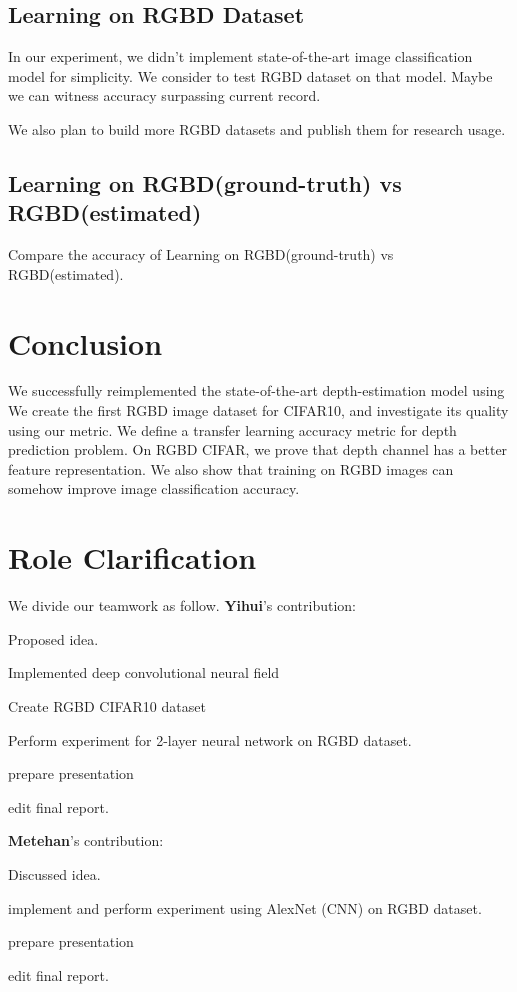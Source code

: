 \documentclass[10pt,twocolumn,letterpaper]{article}
\begin{document}
 
\subsection{Learning on RGBD Dataset}
In our experiment, we didn\rq{}t implement state-of-the-art image classification model\cite{he2015deep} for simplicity.
We consider to test RGBD dataset on that model. 
Maybe we can witness accuracy surpassing current record.

We also plan to build more RGBD datasets and publish them for research usage.

\subsection{Learning on RGBD(ground-truth) vs RGBD(estimated)}
Compare the accuracy of Learning on RGBD(ground-truth) vs RGBD(estimated).

\section{Conclusion}
We successfully reimplemented the state-of-the-art depth-estimation model using
We create the first RGBD image dataset for CIFAR10, and investigate its quality 
using our metric.
We define a transfer learning accuracy metric for depth prediction problem.
On RGBD CIFAR, we prove that depth channel has a better feature representation.
We also show that training on RGBD images can somehow improve image 
classification accuracy.


\section*{Role Clarification}
We divide our teamwork as follow. {\bf Yihui}'s contribution:
\begin{enumerate*}
\item Proposed idea.
\item Implemented deep convolutional neural field 
\item Create RGBD CIFAR10 dataset
\item Perform experiment for 2-layer neural network on RGBD dataset.
\item prepare presentation
\item edit final report.
\end{enumerate*}
{\bf Metehan}'s contribution:
\begin{enumerate*}
\item Discussed idea.
\item implement and perform experiment using AlexNet (CNN) on RGBD dataset. 
\item prepare presentation 
\item edit final report.
\end{enumerate*}

{\small
\printbibliography
}
\end{document}
